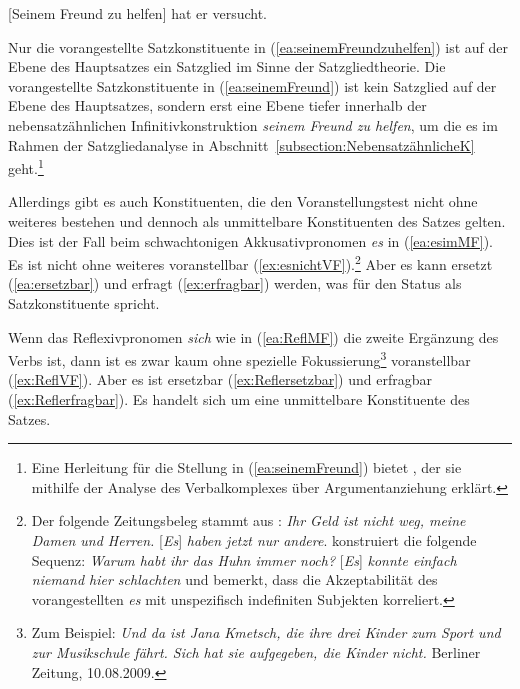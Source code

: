 \ea \label{ea:seinemFreundzuhelfen} [Seinem Freund zu helfen] hat er versucht.
\z 

Nur die vorangestellte Satzkonstituente in (\ref{ea:seinemFreundzuhelfen}) ist auf der Ebene des Hauptsatzes ein Satzglied im Sinne der Satzgliedtheorie. Die vorangestellte Satzkonstituente in (\ref{ea:seinemFreund}) ist kein Satzglied auf der Ebene des Hauptsatzes, sondern erst eine Ebene tiefer innerhalb der nebensatzähnlichen Infinitivkonstruktion \textit{seinem Freund zu helfen}, um die es im Rahmen der Satzgliedanalyse in Abschnitt~\ref{subsection:NebensatzähnlicheK} geht.\footnote{Eine Herleitung für die Stellung in (\ref{ea:seinemFreund}) bietet \citet{Mueller2005Satzstruktur}, der sie mithilfe der Analyse des Verbalkomplexes über Argumentanziehung erklärt.} 


\largerpage
Allerdings gibt es auch Konstituenten, die den Voranstellungstest nicht ohne weiteres bestehen und dennoch als unmittelbare Konstituenten des Satzes gelten. Dies ist der Fall beim schwachtonigen Akkusativpronomen \textit{es} in (\ref{ea:esimMF}). Es ist nicht ohne weiteres voranstellbar (\ref{ex:esnichtVF}).\footnote{Der folgende Zeitungsbeleg stammt aus \citet[162]{Lenerz1994}: \textit{Ihr Geld ist nicht weg, meine Damen und Herren.} [\textit{Es}] \textit{haben jetzt nur andere}. \citet[557]{Meinunger2007} konstruiert die folgende Sequenz: \textit{Warum habt ihr das Huhn immer noch?} [\textit{Es}] \textit{konnte einfach niemand hier schlachten} und bemerkt, dass die Akzeptabilität des vorangestellten \textit{es} mit unspezifisch indefiniten Subjekten korreliert.} Aber es kann ersetzt (\ref{ea:ersetzbar}) und erfragt (\ref{ex:erfragbar}) werden, was für den Status als Satzkonstituente spricht.

\ea \label{ea:esAkkPrn}
\label{ea:esimMF}
\label{ex:esnichtVF}
\label{ea:ersetzbar} 
\label{ex:erfragbar}
\z 
\z 


Wenn das Reflexivpronomen \textit{sich} wie in (\ref{ea:ReflMF}) die zweite Ergänzung des Verbs ist, dann ist es zwar kaum ohne spezielle Fokussierung\footnote{Zum Beispiel: \textit{Und da ist Jana Kmetsch, die ihre drei Kinder zum Sport und zur Musikschule fährt. Sich hat sie aufgegeben, die Kinder nicht.} Berliner Zeitung, 10.08.2009.} voranstellbar (\ref{ex:ReflVF}). Aber es ist ersetzbar (\ref{ex:Reflersetzbar}) und erfragbar (\ref{ex:Reflerfragbar}). Es handelt sich um eine unmittelbare Konstituente des Satzes.


